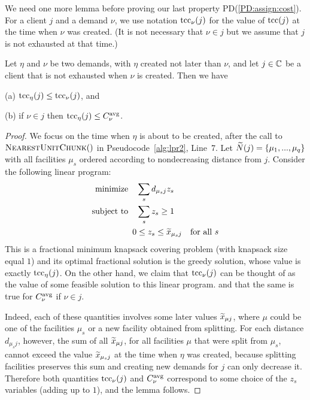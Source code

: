\documentclass[11pt]{article}
\begin{document}

We need one more lemma before proving our last property
PD(\ref{PD:assign:cost}).  For a client $j$ and a demand
$\nu$, we use notation $\textrm{tcc}_{\nu}(j)$ for the value of
$\textrm{tcc}(j)$ at the time when $\nu$ was created. (It is not
necessary that $\nu\in j$ but we assume that $j$ is not
exhausted at that time.)


\begin{lemma}\label{lem: tcc optimal}
  Let $\eta$ and $\nu$ be two demands, with $\eta$ created
  not later than $\nu$, and let $j\in\mathbb{C}$ be a client
  that is not exhausted when $\nu$ is created. Then we have
\begin{description}
	\item{(a)} $\textrm{tcc}_\eta(j) \le \textrm{tcc}_{\nu}(j)$, and 
	\item{(b)} if $\nu\in j$ then $\textrm{tcc}_\eta(j) \le C^{{\mbox{\scriptsize\rm avg}}}_{\nu}$.
\end{description}
\end{lemma}

\begin{proof}
  We focus on the time when $\eta$ is about to be created,
  after the call to ${\textsc{NearestUnitChunk}}()$ in
  Pseudocode~\ref{alg:lpr2}, Line~7.  Let ${\widetilde N}(j) =
  \{\mu_1,...,\mu_q\}$ with all facilities $\mu_s$ ordered
  according to nondecreasing distance from $j$.  Consider
  the following linear program:
%
\begin{alignat*}{1}
	\textrm{minimize} \quad & \sum_s d_{\mu_s j}z_s
			\\
	\textrm{subject to} \quad & \sum_s z_s  \ge 1
			\\
 	0 &\le z_s \le {\widetilde x}_{\mu_s j} \quad \textrm{for all}\ s
\end{alignat*}
%
  This is a fractional
  minimum knapsack covering problem (with knapsack size equal $1$) and its optimal fractional
  solution is the greedy solution, whose value is exactly
  $\textrm{tcc}_\eta(j)$.  On the other hand, we claim that
  $\textrm{tcc}_\nu(j)$ can be thought of as the value of some feasible
  solution to this linear program. and that the same is true for $C^{{\mbox{\scriptsize\rm avg}}}_{\nu}$ if $\nu\in j$.

  Indeed, each of these
  quantities involves some later values ${\widetilde x}_{\mu j}$,
  where $\mu$ could be one of the facilities $\mu_s$ or a
  new facility obtained from splitting. For each distance
  $d_{\mu_s j}$, however, the sum of all ${\widetilde x}_{\mu j}$,
  for all facilities $\mu$ that were split from $\mu_s$, cannot exceed
 the value ${\widetilde x}_{\mu_s j}$ at the time when
  $\eta$ was created, because splitting facilities preserves this sum and
 creating new demands for $j$ can only decrease it.
Therefore both quantities
  $\textrm{tcc}_\nu(j)$ and $C^{{\mbox{\scriptsize\rm avg}}}_{\nu}$ correspond to some
  choice of the $z_s$ variables (adding up to $1$), and the
  lemma follows.
\end{proof}
\end{document}
